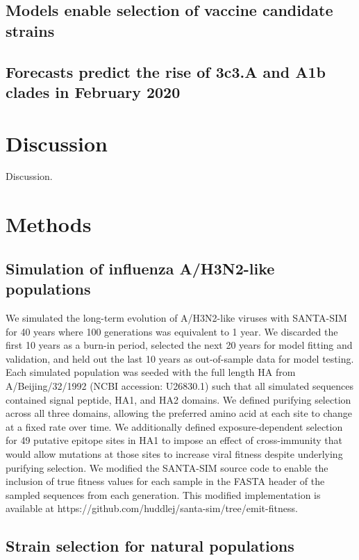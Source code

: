 \subsection*{Models enable selection of vaccine candidate strains}

\subsection*{Forecasts predict the rise of 3c3.A and A1b clades in February 2020}

\section*{Discussion}

Discussion.

\section*{Methods}

\subsection*{Simulation of influenza A/H3N2-like populations}

We simulated the long-term evolution of A/H3N2-like viruses with SANTA-SIM \cite{Jariani2019} for 40 years where 100 generations was equivalent to 1 year.
We discarded the first 10 years as a burn-in period, selected the next 20 years for model fitting and validation, and held out the last 10 years as out-of-sample data for model testing.
Each simulated population was seeded with the full length HA from A/Beijing/32/1992 (NCBI accession: U26830.1) such that all simulated sequences contained signal peptide, HA1, and HA2 domains.
We defined purifying selection across all three domains, allowing the preferred amino acid at each site to change at a fixed rate over time.
We additionally defined exposure-dependent selection for 49 putative epitope sites in HA1 \cite{Luksza:2014hj} to impose an effect of cross-immunity that would allow mutations at those sites to increase viral fitness despite underlying purifying selection.
We modified the SANTA-SIM source code to enable the inclusion of true fitness values for each sample in the FASTA header of the sampled sequences from each generation.
This modified implementation is available at https://github.com/huddlej/santa-sim/tree/emit-fitness.


\subsection*{Strain selection for natural populations}


